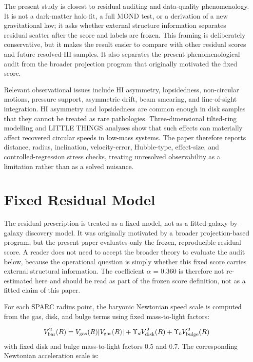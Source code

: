 \documentclass[11pt]{article}
\begin{document}
The present study is closest to residual auditing and data-quality phenomenology. It is not a dark-matter halo fit, a full MOND test, or a derivation of a new gravitational law; it asks whether external structure information separates residual scatter after the score and labels are frozen. This framing is deliberately conservative, but it makes the result easier to compare with other residual scores and future resolved-HI samples. It also separates the present phenomenological audit from the broader projection program that originally motivated the fixed score.

Relevant observational issues include HI asymmetry, lopsidedness, non-circular motions, pressure support, asymmetric drift, beam smearing, and line-of-sight integration. HI asymmetry and lopsidedness are common enough in disk samples that they cannot be treated as rare pathologies. Three-dimensional tilted-ring modelling and LITTLE THINGS analyses show that such effects can materially affect recovered circular speeds in low-mass systems. The paper therefore reports distance, radius, inclination, velocity-error, Hubble-type, effect-size, and controlled-regression stress checks, treating unresolved observability as a limitation rather than as a solved nuisance.

\section{Fixed Residual Model}
The residual prescription is treated as a fixed model, not as a fitted galaxy-by-galaxy discovery model. It was originally motivated by a broader projection-based program, but the present paper evaluates only the frozen, reproducible residual score. A reader does not need to accept the broader theory to evaluate the audit below, because the operational question is simply whether this fixed score carries external structural information. The coefficient $\alpha$ = 0.360 is therefore not re-estimated here and should be read as part of the frozen score definition, not as a fitted claim of this paper.

For each SPARC radius point, the baryonic Newtonian speed scale is computed from the gas, disk, and bulge terms using fixed mass-to-light factors:

\begin{equation}
V_{\rm bar}^2(R)=V_{\rm gas}(R)|V_{\rm gas}(R)|+\Upsilon_d V_{\rm disk}^2(R)+\Upsilon_b V_{\rm bulge}^2(R)
\end{equation}
with fixed disk and bulge mass-to-light factors 0.5 and 0.7. The corresponding Newtonian acceleration scale is:
\end{document}
